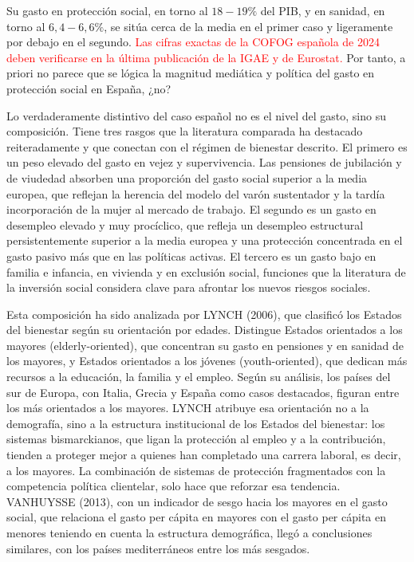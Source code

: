 \documentclass[10pt,a4paper]{article}
\begin{document}
Su gasto en protección social, en torno al $18-19\%$ del PIB, y en sanidad, en torno al $6,4-6,6\%$, se sitúa cerca de la media en el primer caso y ligeramente por debajo en el segundo. \textcolor{red}{Las cifras exactas de la COFOG española de 2024 deben verificarse en la última publicación de la IGAE y de Eurostat.} Por tanto, a priori no parece que se lógica la magnitud mediática y política del gasto en protección social en España, ¿no?

Lo verdaderamente distintivo del caso español no es el nivel del gasto, sino su composición. Tiene tres rasgos que la literatura comparada ha destacado reiteradamente y que conectan con el régimen de bienestar descrito. El primero es un peso elevado del gasto en vejez y supervivencia. Las pensiones de jubilación y de viudedad absorben una proporción del gasto social superior a la media europea, que reflejan la herencia del modelo del varón sustentador y la tardía incorporación de la mujer al mercado de trabajo. El segundo es un gasto en desempleo elevado y muy procíclico, que refleja un desempleo estructural persistentemente superior a la media europea y una protección concentrada en el gasto pasivo más que en las políticas activas. El tercero es un gasto bajo en familia e infancia, en vivienda y en exclusión social, funciones que la literatura de la inversión social considera clave para afrontar los nuevos riesgos sociales.

Esta composición ha sido analizada por LYNCH (2006), que clasificó los Estados del bienestar según su orientación por edades. Distingue Estados orientados a los mayores (elderly-oriented), que concentran su gasto en pensiones y en sanidad de los mayores, y Estados orientados a los jóvenes (youth-oriented), que dedican más recursos a la educación, la familia y el empleo. Según su análisis, los países del sur de Europa, con Italia, Grecia y España como casos destacados, figuran entre los más orientados a los mayores. LYNCH atribuye esa orientación no a la demografía, sino a la estructura institucional de los Estados del bienestar: los sistemas bismarckianos, que ligan la protección al empleo y a la contribución, tienden a proteger mejor a quienes han completado una carrera laboral, es decir, a los mayores. La combinación de sistemas de protección fragmentados con la competencia política clientelar, solo hace que reforzar esa tendencia. VANHUYSSE (2013), con un indicador de sesgo hacia los mayores en el gasto social, que relaciona el gasto per cápita en mayores con el gasto per cápita en menores teniendo en cuenta la estructura demográfica, llegó a conclusiones similares, con los países mediterráneos entre los más sesgados.
\end{document}

